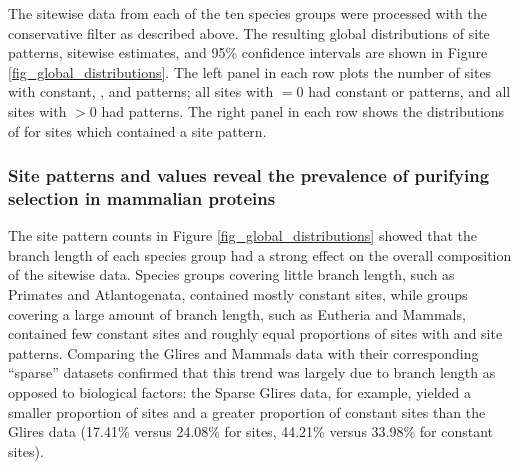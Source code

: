 The sitewise data from each of the ten species groups were processed
with the conservative filter as described above. The resulting global
distributions of site patterns, sitewise \omgml estimates, and 95\%
confidence intervals are shown in Figure
\ref{fig_global_distributions}. The left panel in each row plots the
number of sites with constant, \syn, and \nsyn patterns; all sites
with \omgml$=0$ had constant or \syn patterns, and all sites with
\omgml$>0$ had \nsyn patterns. The right panel in each row shows the
distributions of \omgml for sites which contained a \nsyn site
pattern.

\subsubsection{Site patterns and \omgml values reveal the prevalence of purifying selection in mammalian proteins}

The site pattern counts in Figure \ref{fig_global_distributions}
showed that the branch length of each species group had a strong
effect on the overall composition of the sitewise data. Species groups
covering little branch length, such as Primates and Atlantogenata,
contained mostly constant sites, while groups covering a large amount
of branch length, such as Eutheria and Mammals, contained few constant
sites and roughly equal proportions of sites with \syn and \nsyn site
patterns. Comparing the Glires and Mammals data with their
corresponding ``sparse'' datasets confirmed that this trend was
largely due to branch length as opposed to biological factors: the
Sparse Glires data, for example, yielded a smaller proportion of \nsyn
sites and a greater proportion of constant sites than the Glires data
(17.41\% versus 24.08\% for \nsyn sites, 44.21\% versus 33.98\% for
constant sites).

